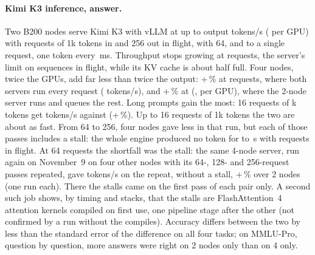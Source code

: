 \paragraph{Kimi K3 inference, answer.} Two B200 nodes serve Kimi K3 with vLLM at up to \TriKimiPeakTok{} output tokens/s (\TriKimiPeakGpu{} per GPU) with \TriKimiPeakConc{} requests of 1k tokens in and 256 out in flight, \TriKimiSixtyFourTok{} with 64, and \TriKimiOneTok{} to a single request, one token every \TriKimiOneTpot\,ms. Throughput stops growing at \TriKimiPeakConc{} requests, the server's limit on sequences in flight, while its KV cache is about half full. Four nodes, twice the GPUs, add far less than twice the output: +\TriKimiFourFiveTwelvePct\,\% at \TriKimiPeakConc{} requests, where both servers run every request (\TriKimiFourFiveTwelveTok{} tokens/s), and +\TriKimiFourTopPct\,\% at \TriKimiTopConc{} (\TriKimiFourTopTok, \TriKimiFourTopGpu{} per GPU), where the 2-node server runs \TriKimiMaxSeqs{} and queues the rest. Long prompts gain the most: 16 requests of \TriKimiCtxTopK k tokens get \TriKimiFourCtxSixteenTok{} tokens/s against \TriKimiCtxSixteenTok{} (+\TriKimiFourCtxSixteenPct\,\%). Up to 16 requests of 1k tokens the two are about as fast. From 64 to 256, four nodes gave less in that run, but each of those passes includes a stall: the whole engine produced no token for \TriKstallFourTwoFiftySixStallSecond{} to \TriKstallFourSixtyFourStall\,s with requests in flight. At 64 requests the shortfall was the stall: the same 4-node server, run again on November~9 on four other nodes with its 64-, 128- and 256-request passes repeated, gave \TriKstallSixtyFourRepeat{} tokens/s on the repeat, without a stall, +\TriKstallSixtyFourPct\,\% over 2 nodes (one run each). There the stalls came on the first pass of each pair only. A second such job shows, by timing and stacks, that the stalls are FlashAttention~4 attention kernels compiled on first use, one pipeline stage after the other (not confirmed by a run without the compiles). Accuracy differs between the two by less than the standard error of the difference on all four tasks; on MMLU-Pro, question by question, more answers were right on 2 nodes only than on 4 only.

